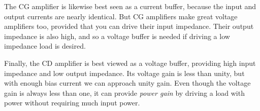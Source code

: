The CG amplifier is likewise best seen as a current buffer, because the input and output currents are nearly identical.  But CG amplifiers make great voltage amplifiers too, provided that you can drive their input impedance.  Their output impedance is also high, and so a voltage buffer is needed if driving a low impedance load is desired.  

Finally, the CD amplifier is best viewed as a voltage buffer, providing high input impedance and low output impedance.  Its voltage gain is less than unity, but with enough bias current we can approach unity gain.  Even though the voltage gain is always less than one, it can provide \emph{power gain} by driving a load with power without requiring much input power.
